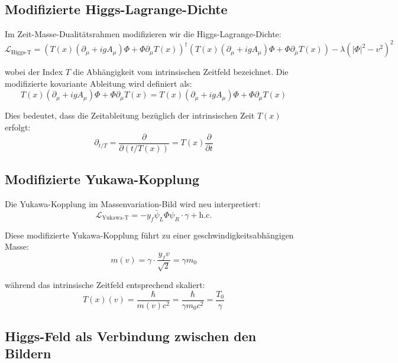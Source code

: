 \documentclass[a4paper,12pt]{article}
\newcommand{\Tfield}{T(x)} %
\newcommand{\DhiggsT}{\Tfield (\partial_\mu + igA_\mu)\Phi + \Phi \partial_\mu \Tfield}
\begin{document}
	\subsection{Modifizierte Higgs-Lagrange-Dichte}
	
	Im Zeit-Masse-Dualitätsrahmen modifizieren wir die Higgs-Lagrange-Dichte:
	\begin{equation}
		\mathcal{L}_{\text{Higgs-T}} = (\DhiggsT)^\dagger (\DhiggsT) - \lambda(|\Phi|^2 - v^2)^2
	\end{equation}
	
	wobei der Index $T$ die Abhängigkeit vom intrinsischen Zeitfeld bezeichnet. Die modifizierte kovariante Ableitung wird definiert als:
	\begin{equation}
		\DhiggsT = \Tfield (\partial_\mu + igA_\mu)\Phi + \Phi \partial_\mu \Tfield
	\end{equation}
	
	Dies bedeutet, dass die Zeitableitung bezüglich der intrinsischen Zeit $\Tfield$ erfolgt:
	\begin{equation}
		\partial_{t/T} = \frac{\partial}{\partial(t/\Tfield)} = \Tfield\frac{\partial}{\partial t}
	\end{equation}
	
	\subsection{Modifizierte Yukawa-Kopplung}
	
	Die Yukawa-Kopplung im Massenvariation-Bild wird neu interpretiert:
	\begin{equation}
		\mathcal{L}_{\text{Yukawa-T}} = -y_f \bar{\psi}_L \Phi \psi_R \cdot \gamma + \text{h.c.}
	\end{equation}
	
	Diese modifizierte Yukawa-Kopplung führt zu einer geschwindigkeitsabhängigen Masse:
	\begin{equation}
		m(v) = \gamma \cdot \frac{y_f v}{\sqrt{2}} = \gamma m_0
	\end{equation}
	
	während das intrinsische Zeitfeld entsprechend skaliert:
	\begin{equation}
		\Tfield(v) = \frac{\hbar}{m(v)c^2} = \frac{\hbar}{\gamma m_0 c^2} = \frac{T_0}{\gamma}
	\end{equation}
	
	\subsection{Higgs-Feld als Verbindung zwischen den Bildern}
	
\end{document}
